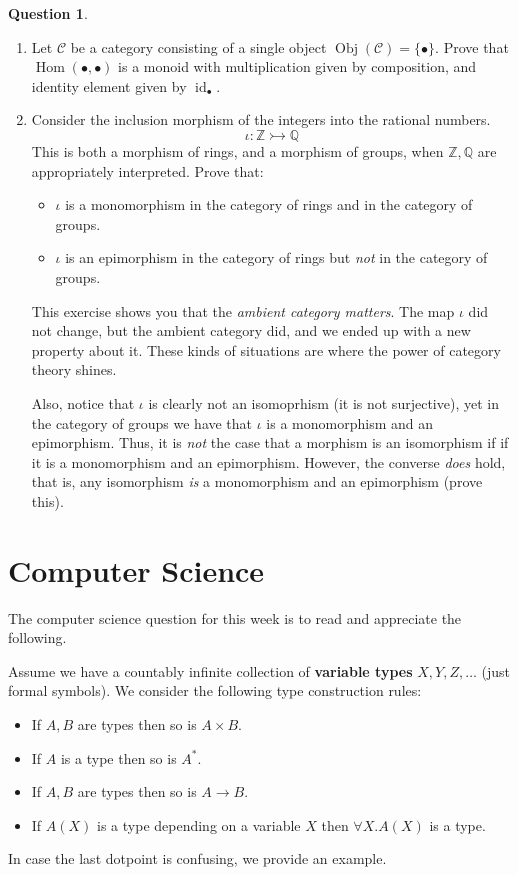 \documentclass[12pt]{article}
\theoremstyle{plain}
\theoremstyle{definition}
\newtheorem{question}[thm]{Question}
\newcommand{\bb}[1]{\mathbb{#1}}
\newcommand{\scr}[1]{\mathscr{#1}}
\newcommand{\lto}{\longrightarrow}
\begin{document}
\begin{question}
\begin{enumerate}
			\item Let $\scr{C}$ be a category consisting of a single object $\operatorname{Obj}(\scr{C}) = \{ \bullet \}$. Prove that $\operatorname{Hom}(\bullet, \bullet)$ is a monoid with multiplication given by composition, and identity element given by $\operatorname{id}_{\bullet}$.
			
			\item Consider the inclusion morphism of the integers into the rational numbers.
			\begin{equation}
				\iota: \bb{Z} \rightarrowtail \bb{Q}
				\end{equation}
			This is both a morphism of rings, and a morphism of groups, when $\bb{Z}, \bb{Q}$ are appropriately interpreted. Prove that:
			\begin{itemize}
				\item $\iota$ is a monomorphism in the category of rings and in the category of groups.
				\item $\iota$ is an epimorphism in the category of rings but \emph{not} in the category of groups.
				\end{itemize}
			This exercise shows you that the \emph{ambient category matters}. The map $\iota$ did not change, but the ambient category did, and we ended up with a new property about it. These kinds of situations are where the power of category theory shines.
			
			Also, notice that $\iota$ is clearly not an isomoprhism (it is not surjective), yet in the category of groups we have that $\iota$ is a monomorphism and an epimorphism. Thus, it is \emph{not} the case that a morphism is an isomorphism if  if it is a monomorphism and an epimorphism. However, the converse \emph{does} hold, that is, any isomorphism \emph{is} a monomorphism and an epimorphism (prove this).
			\end{enumerate}
		\end{question}
	
	\section{Computer Science}
		The computer science question for this week is to read and appreciate the following.
		
		Assume we have a countably infinite collection of \textbf{variable types} $X, Y, Z, \ldots$ (just formal symbols). We consider the following type construction rules:
		\begin{itemize}
			\item If $A, B$ are types then so is $A \times B$.
			\item If $A$ is a type then so is $A^\ast$.
			\item If $A, B$ are types then so is $A \lto B$.
			\item If $A(X)$ is a type depending on a variable $X$ then $\forall X. A(X)$ is a type.
			\end{itemize}
		In case the last dotpoint is confusing, we provide an example.
		
\end{document}
